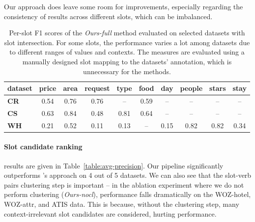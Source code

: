 Our approach does leave some room for improvements, especially regarding the consistency of results across different slots, which can be imbalanced.
\begin{table}[tp]
    \centering
    \small
    \begin{tabular}{l|ccccccccc}
    \hline
    \textbf{dataset} & \textbf{price} & \textbf{area} & \textbf{request} & \textbf{type} & \textbf{food} & \textbf{day} & \textbf{people} & \textbf{stars} & \textbf{stay}
    \\ \hline
    \textbf{CR} & 0.54 & 0.76 & 0.76 & -- & 0.59 & -- & -- & -- & -- \\
    \textbf{CS} & 0.63 & 0.84 & 0.48 & 0.81 & 0.64 & -- & -- & -- & -- \\
    \textbf{WH} & 0.21 & 0.52 & 0.11 & 0.13 & -- & 0.15 & 0.82 & 0.82 & 0.34 \\
    \hline
    \end{tabular}
    
    \caption{Per-slot F1 scores of the \emph{Ours-full} method evaluated on selected datasets with slot intersection. For some slots, the performance varies a lot among datasets due to different ranges of values and contexts. The measures are evaluated using a manually designed slot mapping to the datasets' annotation, which is unnecessary for the methods.}
    \label{table:slotfilling_detail}
\end{table}

\paragraph{Slot candidate ranking}\hspace{-3mm} results are given in Table~\ref{table:avg-precision}.
Our pipeline significantly outperforms \citet{chen2014leveraging}'s approach on 4 out of 5 datasets.
We can also see that the slot-verb pairs clustering step is important -- in the ablation experiment where we do not perform clustering (\emph{Ours-nocl}),
performance falls dramatically on the WOZ-hotel, WOZ-attr, and ATIS data.
This is because, without the clustering step, many context-irrelevant slot candidates are considered, hurting performance.

